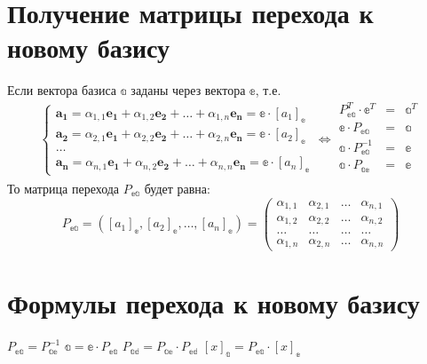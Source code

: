 \section{Получение матрицы перехода к новому базису}
Если вектора базиса $\mathbb{a}$ заданы через вектора $\mathbb{e}$, т.е.
\begin{equation*}
	\begin{cases}
		\boldsymbol{a_1} = \alpha_{1,1}\boldsymbol{e_1} + \alpha_{1,2}\boldsymbol{e_2} + \ldots + \alpha_{1,n}\boldsymbol{e_n} = \mathbb{e} \cdot [a_1]_\mathbb{e} \\
		\boldsymbol{a_2} = \alpha_{2,1}\boldsymbol{e_1} + \alpha_{2,2}\boldsymbol{e_2} + \ldots + \alpha_{2,n}\boldsymbol{e_n} = \mathbb{e} \cdot [a_2]_\mathbb{e} \\
		\ldots \\
		\boldsymbol{a_n} = \alpha_{n,1}\boldsymbol{e_1} + \alpha_{n,2}\boldsymbol{e_2} + \ldots + \alpha_{n,n}\boldsymbol{e_n} = \mathbb{e} \cdot [a_n]_\mathbb{e}
	\end{cases}
	\Leftrightarrow
	\begin{matrix}
		P_\mathbb{ea}^T \cdot \mathbb{e}^T& =& \mathbb{a}^T \\
		\mathbb{e} \cdot P_\mathbb{ea}& =& \mathbb{a}\\
		\mathbb{a} \cdot P_\mathbb{ea}^{-1}& =& \mathbb{e}\\
		\mathbb{a} \cdot P_\mathbb{ae}& =& \mathbb{e}\\
	\end{matrix}
\end{equation*}
То матрица перехода $P_\mathbb{ea}$ будет равна:
\[
P_\mathbb{ea} =
\left([a_1]_\mathbb{e}, [a_2]_\mathbb{e}, \ldots, [a_n]_\mathbb{e}\right) =
\begin{pmatrix}
	\alpha_{1,1}& \alpha_{2, 1}& \ldots& \alpha_{n,1}\\
	\alpha_{1,2}& \alpha_{2, 2}& \ldots& \alpha_{n,2}\\
	\ldots& \ldots& \ldots& \ldots\\
	\alpha_{1,n}& \alpha_{2, n}& \ldots& \alpha_{n,n}
\end{pmatrix}
\]
\section{Формулы перехода к новому базису}
$\displaystyle P_\mathbb{ea} = P_\mathbb{ae}^{-1} $
$\displaystyle \mathbb{a} = \mathbb{e} \cdot P_\mathbb{ea} $
$\displaystyle P_\mathbb{ad} = P_\mathbb{ae}\cdot P_\mathbb{ed} $
$\displaystyle [x]_\mathbb{a} = P_\mathbb{ea} \cdot [x]_\mathbb{e} $
